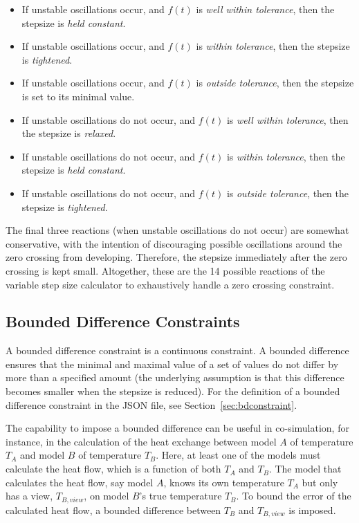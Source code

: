 \begin{itemize}
	\item If unstable oscillations occur, and $f(t)$ is \textit{well within tolerance}, then the stepsize is \textit{held constant}.
	\item If unstable oscillations occur, and $f(t)$ is \textit{within tolerance}, then the stepsize is \textit{tightened}.
	\item If unstable oscillations occur, and $f(t)$ is \textit{outside tolerance}, then the stepsize is set to its minimal value.
	\item If unstable oscillations do not occur, and $f(t)$ is \textit{well within tolerance}, then the stepsize is \textit{relaxed}.
	\item If unstable oscillations do not occur, and $f(t)$ is \textit{within tolerance}, then the stepsize is \textit{held constant}.
	\item If unstable oscillations do not occur, and $f(t)$ is \textit{outside tolerance}, then the stepsize is \textit{tightened}.
\end{itemize}

\noindent The final three reactions (when unstable oscillations do not occur) are somewhat conservative, with the intention of discouraging possible oscillations around the zero crossing from developing. Therefore, the stepsize immediately after the zero crossing is kept small. Altogether, these are the 14 possible reactions of the variable step size calculator to exhaustively handle a zero crossing constraint.

\subsection {Bounded Difference Constraints}\label{sec:bdimpl} 

A bounded difference constraint is a continuous constraint. A bounded difference ensures that the minimal and maximal value of a set of values do not differ by more than a specified amount (the underlying assumption is that this difference becomes smaller when the stepsize is reduced). For the definition of a bounded difference constraint in the JSON file, see Section~\ref{sec:bdconstraint}.

\noindent The capability to impose a bounded difference can be useful in co-simulation, for instance, in the calculation of the heat exchange between model $A$ of temperature $T_A$ and model $B$ of temperature $T_B$. Here, at least one of the models must calculate the heat flow, which is a function of both $T_A$ and $T_B$. The model that calculates the heat flow, say model $A$, knows its own temperature $T_A$ but only has a view, $T_{B,view}$, on model $B$'s true temperature $T_B$. To bound the error of the calculated heat flow, a bounded difference between $T_B$ and $T_{B,view}$ is imposed. 

